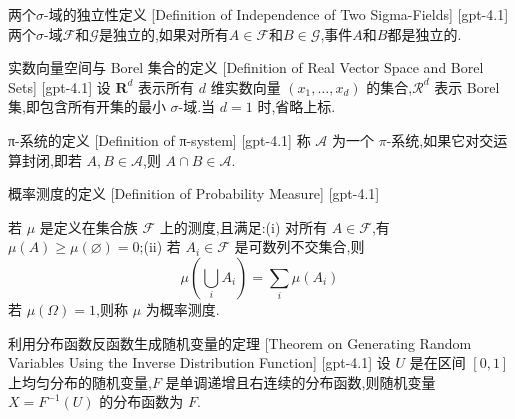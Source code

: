 \documentclass[UTF8]{ctexart}
\begin{document}
    
    
    \begin{dfn}
        {两个$\sigma$-域的独立性定义}
        [Definition of Independence of Two Sigma-Fields]
        [gpt-4.1]
        两个$\sigma$-域$\mathcal{F}$和$\mathcal{G}$是独立的,如果对所有$A \in \mathcal{F}$和$B \in \mathcal{G}$,事件$A$和$B$都是独立的.
    \end{dfn}
    
    
    
    \begin{dfn}
        {实数向量空间与 Borel 集合的定义}
        [Definition of Real Vector Space and Borel Sets]
        [gpt-4.1]
        设 $\mathbf{R}^d$ 表示所有 $d$ 维实数向量 $(x_1, \ldots, x_d)$ 的集合,$\mathcal{R}^d$ 表示 Borel 集,即包含所有开集的最小 $\sigma$-域.当 $d = 1$ 时,省略上标.
    \end{dfn}
    
    
    
    \begin{dfn}
        {π-系统的定义}
        [Definition of π-system]
        [gpt-4.1]
        称 $\mathcal{A}$ 为一个 $\pi$-系统,如果它对交运算封闭,即若 $A, B \in \mathcal{A}$,则 $A \cap B \in \mathcal{A}$.
    \end{dfn}
    
    
    
    \begin{dfn}
        {概率测度的定义}
        [Definition of Probability Measure]
        [gpt-4.1]
        
若 $\mu$ 是定义在集合族 ${\mathcal{F}}$ 上的测度,且满足:(i) 对所有 $A \in {\mathcal{F}}$,有 $\mu (A) \geq \mu (\varnothing) = 0$;(ii) 若 $A_{i} \in {\mathcal{F}}$ 是可数列不交集合,则
\[
\mu \left( \bigcup_{i} A_{i} \right) = \sum_{i} \mu(A_{i})
\]
若 $\mu(\Omega) = 1$,则称 $\mu$ 为概率测度.

    \end{dfn}
    
    
    
    \begin{thm}
        {利用分布函数反函数生成随机变量的定理}
        [Theorem on Generating Random Variables Using the Inverse Distribution Function]
        [gpt-4.1]
        设 $U$ 是在区间 $[0,1]$ 上均匀分布的随机变量,$F$ 是单调递增且右连续的分布函数,则随机变量 $X = F^{-1}(U)$ 的分布函数为 $F$.
    \end{thm}
    
\end{document}
